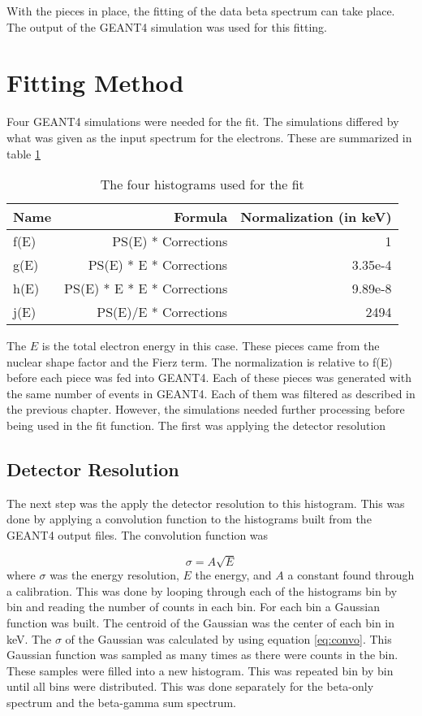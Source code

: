 \documentclass[../MaxHughesThesis.tex]{subfiles}
\begin{document}
With the pieces in place, the fitting of the data beta spectrum can take place.
The output of the GEANT4 simulation was used for this fitting.  

\section{Fitting Method}
Four GEANT4 simulations were needed for the fit.
The simulations differed by what was given as the input spectrum for the electrons.
These are summarized in table \ref{tab:4histfit}

\begin{table}[!hbt]
	\centering
	\caption{The four histograms used for the fit}
		\begin{tabular}{lrr}
		Name & Formula & Normalization (in keV) \\ \hline
		f(E) & PS(E) * Corrections & 1 \\
		g(E) & PS(E) * E * Corrections & 3.35e-4 \\
		h(E) & PS(E)  * E * E * Corrections & 9.89e-8 \\
		j(E) & PS(E)/E * Corrections & 2494 
		\end{tabular}
		\label{tab:4histfit}
\end{table}

The $E$ is the total electron energy in this case.
These pieces came from the nuclear shape factor and the Fierz term. 
The normalization is relative to f(E) before each piece was fed into GEANT4. 
Each of these pieces was generated with the same number of events in GEANT4.
Each of them was filtered as described in the previous chapter.
However, the simulations needed further processing before being used in the fit function. 
The first was applying the detector resolution

\subsection{Detector Resolution}
\label{sec:convolution}
The next step was the apply the detector resolution to this histogram.
This was done by applying a convolution function to the histograms built from the GEANT4 output files.
The convolution function was

\begin{equation}
	\sigma = A\sqrt{E}
	\label{eq:convo}
\end{equation}
where $\sigma$ was the energy resolution, $E$ the energy, and $A$ a constant found through a calibration.
This was done by looping through each of the histograms bin by bin and reading the number of counts in each bin.
For each bin a Gaussian function was built.
The centroid of the Gaussian was the center of each bin in keV.
The $\sigma$ of the Gaussian was calculated by using equation \ref{eq:convo}.
This Gaussian function was sampled as many times as there were counts in the bin.
These samples were filled into a new histogram.
This was repeated bin by bin until all bins were distributed.
This was done separately for the beta-only spectrum and the beta-gamma sum spectrum. 
\end{document}
